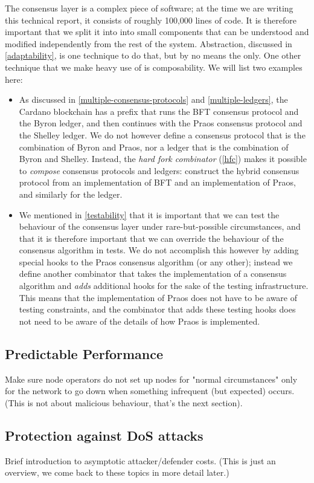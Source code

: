 The consensus layer is a complex piece of software;  at the time we are writing
this technical report, it consists of roughly 100,000 lines of code. It is
therefore important that we split it into into small components that can be
understood and modified independently from the rest of the system. Abstraction,
discussed in \cref{adaptability}, is one technique to do that, but by no means
the only. One other technique that we make heavy use of is composability. We
will list two examples here:

\begin{itemize}
\item As discussed in \cref{multiple-consensus-protocols} and
\cref{multiple-ledgers}, the Cardano blockchain has a prefix that runs the BFT
consensus protocol and the Byron ledger, and then continues with the Praos
consensus protocol and the Shelley ledger. We do not however define a consensus
protocol that is the combination of Byron and Praos, nor a ledger that is the
combination of Byron and Shelley. Instead, the \emph{hard fork combinator}
(\cref{hfc}) makes it possible to \emph{compose} consensus protocols and
ledgers: construct the hybrid consensus protocol from an implementation of BFT
and an implementation of Praos, and similarly for the ledger.

\item We mentioned in \cref{testability} that it is important that we can
test the behaviour of the consensus layer under rare-but-possible circumstances,
and that it is therefore important that we can override the behaviour of the
consensus algorithm in tests. We do not accomplish this however by adding
special hooks to the Praos consensus algorithm (or any other); instead we define
another combinator that takes the implementation of a consensus algorithm and
\emph{adds} additional hooks for the sake of the testing infrastructure. This
means that the implementation of Praos does not have to be aware of testing
constraints, and the combinator that adds these testing hooks does not need to
be aware of the details of how Praos is implemented.
\end{itemize}

\subsection{Predictable Performance}

Make sure node operators do not set up nodes for "normal circumstances" only
for the network to go down when something infrequent (but expected) occurs.
(This is not about malicious behaviour, that's the next section).

\duncan

\subsection{Protection against DoS attacks}

Brief introduction to asymptotic attacker/defender costs. (This is just an
overview, we come back to these topics in more detail later.)

\duncan
